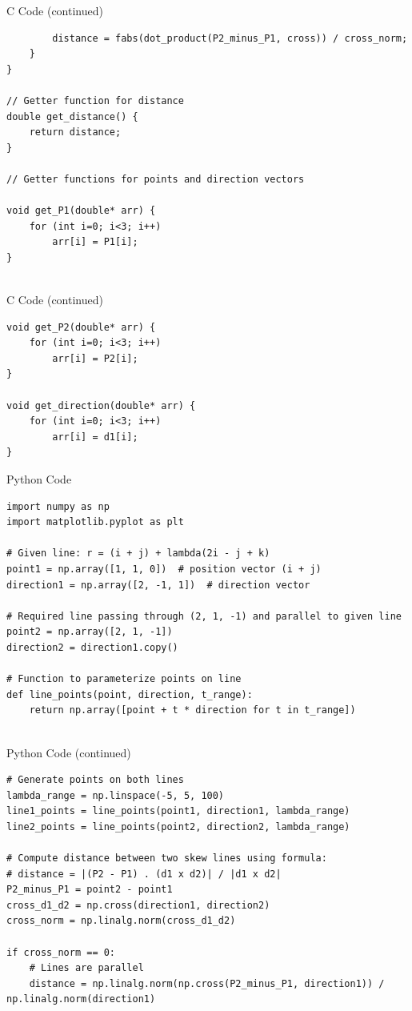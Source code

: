 \documentclass{beamer}
\begin{document}
\begin{frame}[fragile]{C Code (continued)}
\begin{lstlisting}
        distance = fabs(dot_product(P2_minus_P1, cross)) / cross_norm;
    }
}

// Getter function for distance
double get_distance() {
    return distance;
}

// Getter functions for points and direction vectors

void get_P1(double* arr) {
    for (int i=0; i<3; i++)
        arr[i] = P1[i];
}


\end{lstlisting}
\end{frame}

\begin{frame}[fragile]{C Code (continued)}
\begin{lstlisting}
void get_P2(double* arr) {
    for (int i=0; i<3; i++)
        arr[i] = P2[i];
}

void get_direction(double* arr) {
    for (int i=0; i<3; i++)
        arr[i] = d1[i];
}

\end{lstlisting}
\end{frame}

\begin{frame}[fragile]{Python Code }
\begin{lstlisting}
import numpy as np
import matplotlib.pyplot as plt

# Given line: r = (i + j) + lambda(2i - j + k)
point1 = np.array([1, 1, 0])  # position vector (i + j)
direction1 = np.array([2, -1, 1])  # direction vector

# Required line passing through (2, 1, -1) and parallel to given line
point2 = np.array([2, 1, -1])
direction2 = direction1.copy()

# Function to parameterize points on line
def line_points(point, direction, t_range):
    return np.array([point + t * direction for t in t_range])


\end{lstlisting}
\end{frame}

\begin{frame}[fragile]{Python Code (continued)}
\begin{lstlisting}
# Generate points on both lines
lambda_range = np.linspace(-5, 5, 100)
line1_points = line_points(point1, direction1, lambda_range)
line2_points = line_points(point2, direction2, lambda_range)

# Compute distance between two skew lines using formula:
# distance = |(P2 - P1) . (d1 x d2)| / |d1 x d2|
P2_minus_P1 = point2 - point1
cross_d1_d2 = np.cross(direction1, direction2)
cross_norm = np.linalg.norm(cross_d1_d2)

if cross_norm == 0:
    # Lines are parallel
    distance = np.linalg.norm(np.cross(P2_minus_P1, direction1)) / np.linalg.norm(direction1)

\end{lstlisting}
\end{frame}
\end{document}
